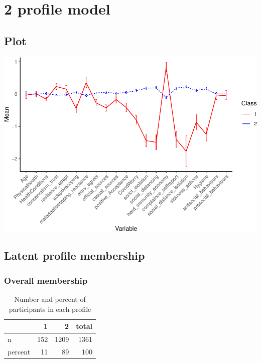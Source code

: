 \documentclass[]{article}
\begin{document}
\newpage

\hypertarget{profile-model}{%
\section{2 profile model}\label{profile-model}}

\hypertarget{plot}{%
\subsection{Plot}\label{plot}}

\includegraphics{lpa_analyses_files/figure-latex/unnamed-chunk-5-1.pdf}

\hypertarget{latent-profile-membership}{%
\subsection{Latent profile membership}\label{latent-profile-membership}}

\hypertarget{overall-membership}{%
\subsubsection{Overall membership}\label{overall-membership}}

\begin{table}[H]

\caption{\label{tab:unnamed-chunk-6}Number and percent of participants in each profile}
\centering
\fontsize{6}{8}\selectfont
\begin{tabular}[t]{lrrr}
\toprule
  & 1 & 2 & total\\
\midrule
n & 152 & 1209 & 1361\\
percent & 11 & 89 & 100\\
\bottomrule
\end{tabular}
\end{table}
\end{document}
